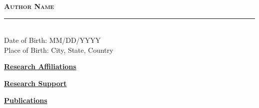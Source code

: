 \newcommand{\HRule}{\rule{8cm}{0.5mm}}

\begin{center}
\textsc{\textbf{\LARGE{Author Name}}} \\
\HRule \\
Date of Birth: MM/DD/YYYY \\[-0.25cm]
Place of Birth: City, State, Country
\end{center}

\vspace{2pt}
\begin{center}
\textrm{\textbf{\large{\underline{Research Affiliations}}}}\end{center}

\begin{multicols}{2}
\columnbreak
{}
\end{multicols}

\vspace{-0.75cm}
\begin{multicols}{2}
\columnbreak
{}
\end{multicols}

\begin{center}
\textrm{\textbf{\large{\underline{Research Support}}}}\end{center}

\begin{multicols}{2}
\columnbreak
{}
\end{multicols}

\vspace{-0.75cm}
\begin{multicols}{2}
\columnbreak
{}
\end{multicols}

\vspace{2pt}
\begin{center}\textrm{\textbf{\large{\underline{Publications}}}}\end{center}
{\singlespace
\vspace{-0.5cm}
\printbibliography[env=nolabelbib,type=article,heading=none]}
